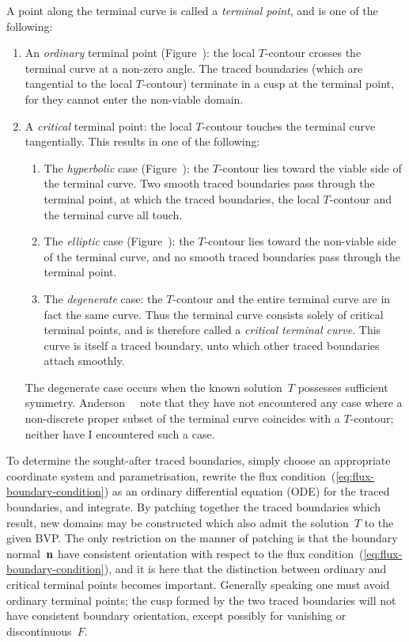 A point along the terminal curve is called a \emph{terminal point},
and is one of the following:
\begin{enumerate}
  \item
    An \emph{ordinary} terminal point (Figure~\tbd):
    the local $T$-contour crosses the terminal curve at a non-zero angle.
    The traced boundaries (which are tangential to the local $T$-contour)
    terminate in a cusp at the terminal point,
    for they cannot enter the non-viable domain.
  \item
    A \emph{critical} terminal point:
    the local $T$-contour touches the terminal curve tangentially.
    This results in one of the following:
    \begin{enumerate}
      \item
        The \emph{hyperbolic} case (Figure~\tbd):
        the $T$-contour lies toward the viable side of the terminal curve.
        Two smooth traced boundaries pass through the terminal point,
        at which the traced boundaries,
        the local $T$-contour and the terminal curve
        all touch.
      \item
        The \emph{elliptic} case (Figure~\tbd):
        the $T$-contour lies toward the non-viable side of the terminal curve,
        and no smooth traced boundaries pass through the terminal point.
      \item
        The \emph{degenerate} case:
        the $T$-contour and the entire terminal curve
        are in fact the same curve.
        Thus the terminal curve consists solely of critical terminal points,
        and is therefore called a \emph{critical terminal curve}.
        This curve is itself a traced boundary,
        unto which other traced boundaries attach smoothly.
    \end{enumerate}
    The degenerate case occurs
    when the known solution~$T$ possesses sufficient symmetry.
    Anderson~\etal~\cite{anderson-2007-boundary-tracing-i-theory}
    note that they have not encountered any case
    where a non-discrete proper subset of the terminal curve
    coincides with a $T$-contour;
    neither have I encountered such a case.
\end{enumerate}

To determine the sought-after traced boundaries,
simply choose an appropriate coordinate system and parametrisation,
rewrite the flux condition~(\ref{eq:flux-boundary-condition})
as an ordinary differential equation (ODE) for the traced boundaries,
and integrate.
By patching together the traced boundaries which result,
new domains may be constructed
which also admit the solution~$T$ to the given BVP\@.
The only restriction on the manner of patching
is that the boundary normal~$\mathop{}\!\boldsymbol{\mathrm{n}}$ have consistent orientation
with respect to the flux condition~(\ref{eq:flux-boundary-condition}),
and it is here that
the distinction between ordinary and critical terminal points
becomes important.
Generally speaking one must avoid ordinary terminal points;
the cusp formed by the two traced boundaries
will not have consistent boundary orientation,
except possibly for vanishing or discontinuous~$F$.

